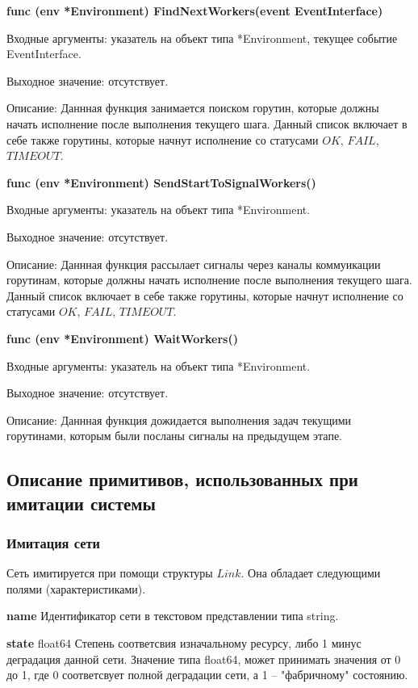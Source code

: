 \textbf{func (env *Environment) FindNextWorkers(event EventInterface)}

Входные аргументы: указатель на объект типа *Environment, текущее событие EventInterface.

Выходное значение: отсутствует. 

Описание: Даннная функция занимается поиском горутин, которые должны начать исполнение после выполнения текущего шага. Данный список включает в себе также горутины, которые начнут исполнение со статусами $OK$, $FAIL$, $TIMEOUT$.

\textbf{func (env *Environment) SendStartToSignalWorkers()}

Входные аргументы: указатель на объект типа *Environment.

Выходное значение: отсутствует. 

Описание: Даннная функция рассылает сигналы через каналы коммуикации горутинам, которые должны начать исполнение после выполнения текущего шага. Данный список включает в себе также горутины, которые начнут исполнение со статусами $OK$, $FAIL$, $TIMEOUT$.

\textbf{func (env *Environment) WaitWorkers() }

Входные аргументы: указатель на объект типа *Environment.

Выходное значение: отсутствует. 

Описание: Даннная функция дожидается выполнения задач текущими горутинами, которым были посланы сигналы на предыдущем этапе.



\subsection{Описание примитивов, использованных при имитации системы}

\subsubsection{Имитация сети}

Сеть имитируется при помощи структуры $Link$. Она обладает следующими полями (характеристиками). 

\textbf{name}
Идентификатор сети в текстовом представлении типа string. 

\textbf{state}	 float64
Степень соответсвия изначальному ресурсу, либо 1 минус деградация данной сети. Значение типа float64, может принимать значения от 0 до 1, где 0 соответсвует полной деградации сети, а 1 -- "фабричному" состоянию. 

